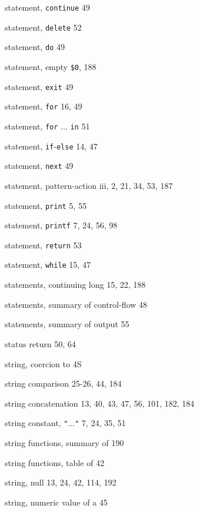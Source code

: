 \begin{multicols}{3}
\hangindent=3pc  statement, \verb'continue' 49

\hangindent=3pc  statement, \verb'delete' 52

\hangindent=3pc  statement, \verb'do' 49

\hangindent=3pc  statement, empty \verb'$0', 188

\hangindent=3pc  statement, \verb'exit' 49

\hangindent=3pc  statement, \verb'for' 16, 49

\hangindent=3pc  statement, \verb'for' ... \verb'in' 51

\hangindent=3pc  statement, \verb'if'-\verb'else' 14, 47

\hangindent=3pc  statement, \verb'next' 49

\hangindent=3pc  statement, pattern-action iii, 2, 21, 34, 53, 187

\hangindent=3pc  statement, \verb'print' 5, 55

\hangindent=3pc  statement, \verb'printf' 7, 24, 56, 98

\hangindent=3pc  statement, \verb'return' 53

\hangindent=3pc  statement, \verb'while' 15, 47

\hangindent=3pc  statements, continuing long 15, 22, 188

\hangindent=3pc  statements, summary of control-flow 48

\hangindent=3pc  statements, summary of output 55

\hangindent=3pc  status return 50, 64

\hangindent=3pc  string, coercion to 4S

\hangindent=3pc  string comparison 25-26, 44, 184

\hangindent=3pc  string concatenation 13, 40, 43,  47, 56, 101, 182, 184

\hangindent=3pc  string constant, \verb'"'...\verb'"' 7, 24, 35, 51

\hangindent=3pc  string functions, summary of 190

\hangindent=3pc  string functions, table of 42

\hangindent=3pc  string, null 13, 24, 42, 114, 192

\hangindent=3pc  string, numeric value of a 45


\end{multicols}
